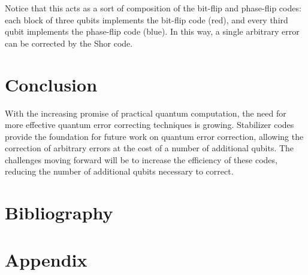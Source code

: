 \documentclass{article}
\begin{document}
                Notice that this acts as a sort of composition of the bit-flip and phase-flip codes: each block of three qubits implements the bit-flip code (red), and every third qubit implements the phase-flip code (blue).
                In this way, a single arbitrary error can be corrected by the Shor code.

\section{Conclusion}
        
        With the increasing promise of practical quantum computation, the need for more effective quantum error correcting techniques is growing.
        Stabilizer codes provide the foundation for future work on quantum error correction, allowing the correction of arbitrary errors at the cost of a number of additional qubits.
        The challenges moving forward will be to increase the efficiency of these codes, reducing the number of additional qubits necessary to correct.


\newpage
\section{Bibliography}
        \nocite{*}
        \printbibliography

\newpage
\section{Appendix}
\end{document}
